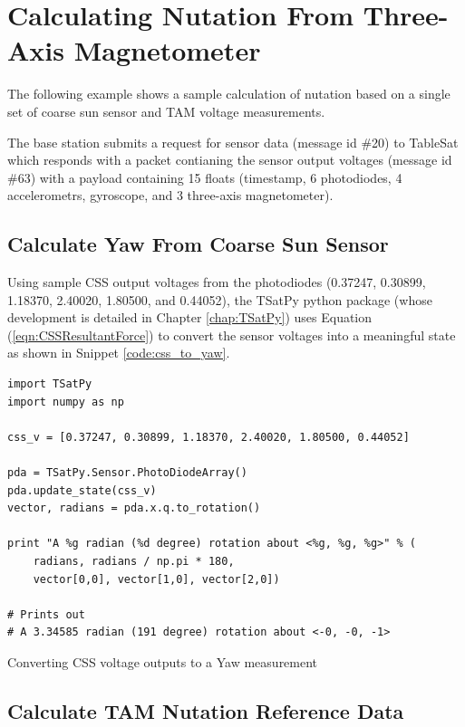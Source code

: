 \section{Calculating Nutation From Three-Axis Magnetometer}

The following example shows a sample calculation of nutation based on a single set of coarse sun sensor and TAM voltage measurements.

The base station submits a request for sensor data (message id \#20) to TableSat which responds with a packet contianing the sensor output voltages (message id \#63) with a payload containing 15 floats (timestamp, 6 photodiodes, 4 accelerometrs, gyroscope, and 3 three-axis magnetometer).

\subsection{Calculate Yaw From Coarse Sun Sensor}

Using sample CSS output voltages from the photodiodes (0.37247, 0.30899, 1.18370, 2.40020, 1.80500, and 0.44052), the TSatPy python package (whose development is detailed in Chapter \ref{chap:TSatPy}) uses Equation (\ref{eqn:CSSResultantForce}) to convert the sensor voltages into a meaningful state as shown in Snippet \ref{code:css_to_yaw}.

\begin{listing}[H]
\begin{singlespace}
  \begin{verbatim}
import TSatPy
import numpy as np

css_v = [0.37247, 0.30899, 1.18370, 2.40020, 1.80500, 0.44052]

pda = TSatPy.Sensor.PhotoDiodeArray()
pda.update_state(css_v)
vector, radians = pda.x.q.to_rotation()

print "A %g radian (%d degree) rotation about <%g, %g, %g>" % (
    radians, radians / np.pi * 180,
    vector[0,0], vector[1,0], vector[2,0])

# Prints out
# A 3.34585 radian (191 degree) rotation about <-0, -0, -1>
  \end{verbatim}
\caption{Converting CSS voltage outputs to a Yaw measurement}
\label{code:css_to_yaw}
\nocite{minted}
\end{singlespace}
\end{listing}

\subsection{Calculate TAM Nutation Reference Data}
\label{subsec:CalculateTAMNutationReferenceData}

